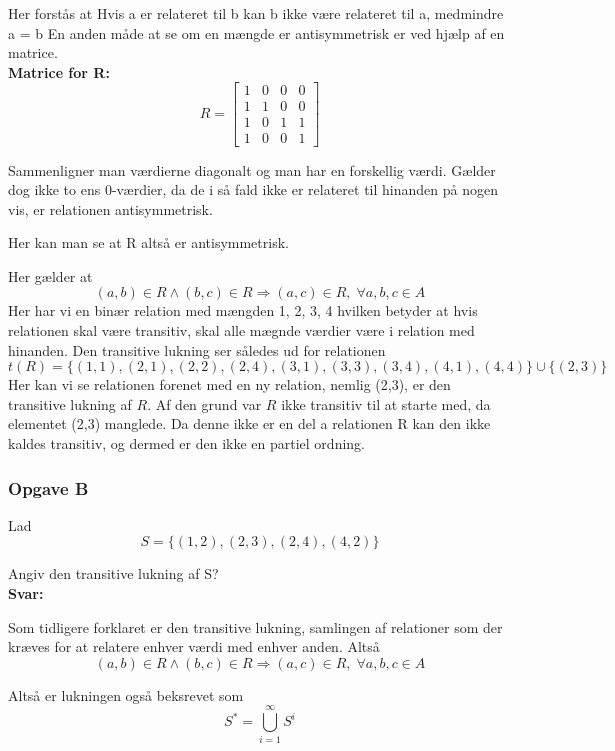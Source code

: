 \documentclass{article}
\begin{document}
Her forstås at  Hvis a er relateret til b kan b ikke være relateret til a, medmindre a = b
En anden måde at se om en mængde er antisymmetrisk er ved hjælp af en matrice.\\
\textbf{Matrice for R:}\\ 


\[R=\begin{bmatrix}
1 & 0 & 0 & 0\\
1 & 1 & 0 & 0\\
1 & 0 & 1 & 1\\
1 & 0 & 0 & 1
\end{bmatrix}\]


Sammenligner man værdierne diagonalt og man har en forskellig værdi. Gælder dog ikke to ens 0-værdier, da de i så fald ikke er relateret til hinanden på nogen vis, er relationen antisymmetrisk. 

Her kan man se at R altså er antisymmetrisk.

Her gælder at \[(a,b)\in R \wedge (b,c)\in R \Rightarrow (a,c)\in R, \;  \forall a,b,c \in A\]
Her har vi en binær relation med mængden 1, 2, 3, 4 hvilken betyder at hvis relationen skal være transitiv, skal alle mægnde værdier være i relation med hinanden.
Den transitive lukning ser således ud for relationen \[t(R) = \{(1,1), (2,1), (2,2), (2,4), (3,1), (3,3), (3,4), (4,1), (4,4)\} \cup \{(2,3)\}\]
Her kan vi se relationen forenet med en ny relation, nemlig (2,3), er den transitive lukning af $R$. Af den grund var $R$ ikke transitiv til at starte med, da elementet (2,3) manglede. Da denne ikke er en del a relationen R kan den ikke kaldes transitiv, og dermed er den ikke en partiel ordning.

\vspace{2cm}


\subsubsection{Opgave B}
Lad \[S = \{(1, 2),(2, 3),(2, 4),(4, 2)\}\]


Angiv den transitive lukning af S?
\\\textbf{Svar:}


Som tidligere forklaret er den transitive lukning, samlingen af relationer som der kræves for at relatere enhver værdi med enhver anden. Altså \[(a,b)\in R \wedge (b,c)\in R \Rightarrow (a,c)\in R, \;  \forall a,b,c \in A\]

Altså er lukningen også beksrevet som \[S^*=\bigcup_{i=1}^{\infty} S^i\]
\end{document}
